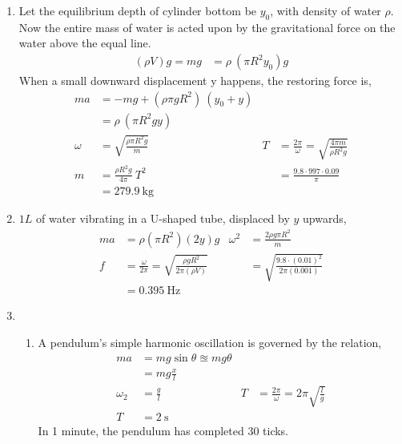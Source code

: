 \begin{enumerate}
    \item Let the equilibrium depth of cylinder bottom be $ y_{0} $, with density of
          water $ \rho $.
          Now the entire mass of water is acted upon by the gravitational force on the
          water above the equal line.
          \begin{align}
              (\rho V)g = mg & = \rho\ (\pi R^{2} y_{0})g
          \end{align}
          When a small downward displacement y happens, the restoring force is,
          \begin{align}
              ma     & = -mg + (\rho\pi g R^{2})\ (y_{0} + y)                       \\
                     & = \rho\ (\pi R^{2} g y)                                      \\
              \omega & =\sqrt{\frac{\rho\pi R^{2}g}{m}}                           &
              T      & = \frac{2\pi}{\omega} = \sqrt{\frac{4\pi m}{\rho R^{2} g}}   \\
              m      & =\frac{\rho R^{2}g}{4\pi}\ T^{2}                           &
                     & = \frac{9.8 \cdot 997 \cdot 0.09}{\pi}                       \\
                     & = \SI{279.9}{\kg}
          \end{align}

    \item $ 1 L $ of water vibrating in a U-shaped tube, displaced by $ y $ upwards,
          \begin{align}
              ma & = \rho (\pi R^{2})(2y)g
                 & \omega^{2}                                                        &
              = \frac{2\rho g \pi R^{2}}{m}                                            \\
              f  & = \frac{\omega}{2\pi} = \sqrt{\frac{\rho g R^{2}}{2\pi (\rho V)}}
                 &                                                                   &
              = \sqrt{\frac{9.8 \cdot (0.01)^{2}}{2 \pi (0.001)}}                      \\
                 & = \SI{0.395}{\Hz}
          \end{align}

    \item
          \begin{enumerate}
              \item A pendulum's simple harmonic oscillation is governed by the relation,
                    \begin{align}
                        ma         & = mg \sin \theta \approxeq mg \theta              \\
                                   & = mg \frac{x}{l}                                  \\
                        \omega_{2} & = \frac{g}{l}                                   &
                        T          & = \frac{2\pi}{\omega} = 2\pi \sqrt{\frac{l}{g}}   \\
                        T          & = \SI{2}{\s}
                    \end{align}
                    In 1 minute, the pendulum has completed 30 ticks.


\end{enumerate}
\end{enumerate}
